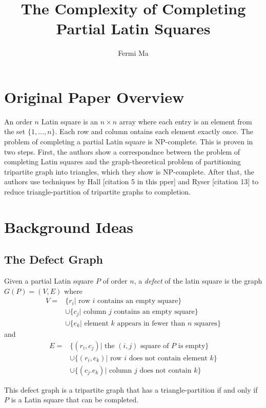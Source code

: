 \documentclass[11pt]{article}
\author{Fermi Ma}
\title{The Complexity of Completing Partial Latin Squares}
\begin{document}
\maketitle

\section{Original Paper Overview}

An order $n$ Latin square is an $n \times n$ array where each entry is an element from the set $\{1,\dots,n\}$. Each row and column ontains each element exactly once. The problem of completing a partial Latin square is NP-complete. This is proven in two steps. First, the authors show a correspondnce between the problem of completing Latin squares and the graph-theoretical problem of partitioning tripartite graph into triangles, which they show is NP-complete. After that, the authors use techniques by Hall [citation 5 in this pper] and Ryser [citation 13] to reduce triangle-partition of tripartite graphs to completion.

\section{Background Ideas}

\subsection{The Defect Graph}

Given a partial Latin square $P$ of order $n$, a \emph{defect} of the latin square is the graph $G(P) = (V,E)$ where
\begin{align*}
V = &\{r_i | \text{ row }i\text{ contains an empty square}\} \\
&\cup \{c_j | \text{ column }j\text{ contains an empty square}\} \\
&\cup \{e_k | \text{ element }k\text{ appears in fewer than }n\text{ squares}\}
\end{align*}
and 
\begin{align*}
E = &\{(r_i,c_j) | \text{ the }(i,j)\text{ square of }P\text{ is empty}\} \\
&\cup \{(r_i,e_k) | \text{ row }i\text{ does not contain element }k\} \\
&\cup \{(c_j.e_k) | \text{ column }j\text{ does not contain }k\}
\end{align*}

This defect graph is a tripartite graph that has a triangle-partition if and only if $P$ is a Latin square that can be completed.
\end{document}
